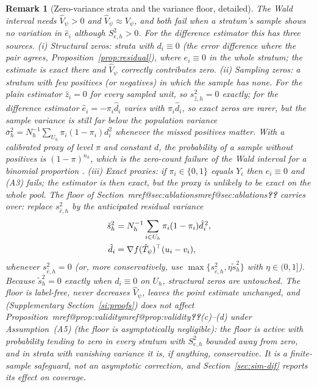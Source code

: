 \documentclass[pdflatex,sn-mathphys-num,iicol]{sn-jnl}
\makeatletter
\theoremstyle{thmstyleone}
\theoremstyle{thmstyletwo}
\newtheorem{remark}{Remark}
\theoremstyle{thmstylethree}
\newcommand{\Mref}[1]{\ifcsname mref@#1\endcsname\csname mref@#1\endcsname\else\textbf{??}\fi}
\makeatother
\begin{document}
\begin{remark}[Zero-variance strata and the variance floor, detailed]\label{rem:zero-var-ext}
The Wald interval needs $\hat V_\psi>0$ and $\hat V_\psi\approx V_\psi$, and both fail when a stratum's sample shows no variation in $\hat e_i$ although
$S^2_{e,h}>0$. For the difference estimator this has three sources. (i) \emph{Structural zeros}: strata with $d_i\equiv0$ (the error
difference where the pair agrees, Proposition~\ref{prop:residual}), where $e_i\equiv0$ in the whole stratum; the estimate is exact there and
$\hat V_\psi$ correctly contributes zero. (ii) \emph{Sampling zeros}: a stratum with few positives (or negatives) in which the sample has none. For the plain estimator $\hat z_i=0$ for every sampled unit, so $s^2_{\hat z,h}=0$ exactly;
for the difference estimator $\hat e_i=-\pi_i\hat d_i$ varies with $\pi_i\hat d_i$, so exact zeros are rarer, but the sample variance is still far below the
population variance $\bar\sigma^2_h=N_h^{-1}\sum_{U_h}\pi_i(1-\pi_i)d_i^2$ whenever the missed positives matter. With a calibrated proxy of level $\pi$ and constant $d$, the
probability of a sample without positives is $(1-\pi)^{n_h}$, which is the zero-count failure of the Wald interval for a binomial proportion \citep{brown2001}.
(iii) \emph{Exact proxies}: if $\pi_i\in\{0,1\}$ equals $Y_i$ then $e_i\equiv0$ and
(A3) fails; the estimator is then exact, but the proxy is unlikely to be exact on the whole pool. The floor of Section~\Mref{sec:ablations} carries over: replace $s^2_{\hat e,h}$ by the anticipated
residual variance
\begin{align}
\tilde s^2_{h}&=N_h^{-1}\sum_{i\in U_h}\pi_i(1-\pi_i)\hat d_i^{\,2},\label{eq:floor}\\
\hat d_i&=\nabla f(\hat T_\psi)^\top(u_i-v_i),\notag
\end{align}
whenever $s^2_{\hat e,h}=0$ (or, more conservatively, use $\max\{s^2_{\hat e,h},\eta\tilde s^2_h\}$ with $\eta\in(0,1]$). Because $\tilde s^2_h=0$ exactly when $d_i\equiv0$ on $U_h$, structural zeros
are untouched. The floor is label-free, never decreases $\hat V_\psi$, leaves the point estimate unchanged, and (Supplementary Section~\ref{si:proofs}) does not affect
Proposition~\Mref{prop:validity}(c)--(d) under Assumption~(A5) (the floor is asymptotically negligible): the floor is active with probability tending to zero in every stratum with $S^2_{e,h}$ bounded away from zero, and in strata
with vanishing variance it is, if anything, conservative. It is a finite-sample safeguard, not an asymptotic correction, and Section~\ref{sec:sim-dif} reports its effect on coverage.
\end{remark}
\end{document}
